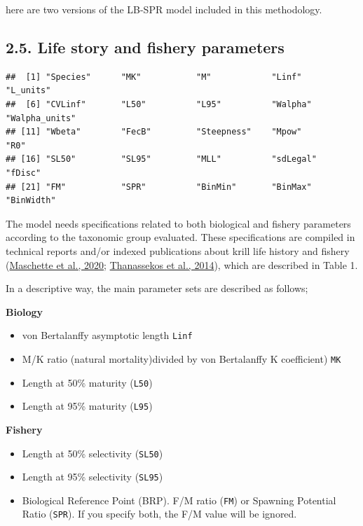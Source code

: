 \documentclass[
]{article}
\providecommand{\tightlist}{%
  \setlength{\itemsep}{0pt}\setlength{\parskip}{0pt}}
\begin{document}
here are two versions of the LB-SPR model included in this methodology.

\hypertarget{life-story-and-fishery-parameters}{%
\subsection{2.5. Life story and fishery
parameters}\label{life-story-and-fishery-parameters}}

\begin{verbatim}
##  [1] "Species"      "MK"           "M"            "Linf"         "L_units"     
##  [6] "CVLinf"       "L50"          "L95"          "Walpha"       "Walpha_units"
## [11] "Wbeta"        "FecB"         "Steepness"    "Mpow"         "R0"          
## [16] "SL50"         "SL95"         "MLL"          "sdLegal"      "fDisc"       
## [21] "FM"           "SPR"          "BinMin"       "BinMax"       "BinWidth"
\end{verbatim}

The model needs specifications related to both biological and fishery
parameters according to the taxonomic group evaluated. These
specifications are compiled in technical reports and/or indexed
publications about krill life history and fishery
(\protect\hyperlink{ref-Maschette2020}{Maschette et al., 2020};
\protect\hyperlink{ref-Thanassekos2014}{Thanassekos et al., 2014}),
which are described in Table 1.

In a descriptive way, the main parameter sets are described as follows;

\textbf{Biology}

\begin{itemize}
\tightlist
\item
  von Bertalanffy asymptotic length \texttt{Linf}
\item
  M/K ratio (natural mortality)divided by von Bertalanffy K coefficient)
  \texttt{MK}
\item
  Length at 50\% maturity (\texttt{L50})
\item
  Length at 95\% maturity (\texttt{L95})
\end{itemize}

\textbf{Fishery}

\begin{itemize}
\tightlist
\item
  Length at 50\% selectivity (\texttt{SL50})
\item
  Length at 95\% selectivity (\texttt{SL95})
\item
  Biological Reference Point (BRP). F/M ratio (\texttt{FM}) or Spawning
  Potential Ratio (\texttt{SPR}). If you specify both, the F/M value
  will be ignored.
\end{itemize}
\end{document}
